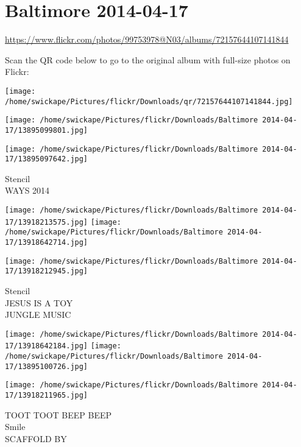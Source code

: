 \documentclass[10pt,letterpaper]{article}
\title{}
\author{}
\date{}
\begin{document}
\section*{Baltimore 2014-04-17}

\url{https://www.flickr.com/photos/99753978@N03/albums/72157644107141844}

Scan the QR code below to go to the original album with full-size photos on Flickr:

\texttt{[image: /home/swickape/Pictures/flickr/Downloads/qr/72157644107141844.jpg]}
\pagebreak

\texttt{[image: /home/swickape/Pictures/flickr/Downloads/Baltimore 2014-04-17/13895099801.jpg]}

\vspace{0.25in}
\texttt{[image: /home/swickape/Pictures/flickr/Downloads/Baltimore 2014-04-17/13895097642.jpg]}

Stencil\\
WAYS 2014
\pagebreak

\texttt{[image: /home/swickape/Pictures/flickr/Downloads/Baltimore 2014-04-17/13918213575.jpg]}
\texttt{[image: /home/swickape/Pictures/flickr/Downloads/Baltimore 2014-04-17/13918642714.jpg]}

\vspace{0.25in}
\texttt{[image: /home/swickape/Pictures/flickr/Downloads/Baltimore 2014-04-17/13918212945.jpg]}

Stencil\\
JESUS IS A TOY\\
JUNGLE MUSIC
\pagebreak

\texttt{[image: /home/swickape/Pictures/flickr/Downloads/Baltimore 2014-04-17/13918642184.jpg]}
\texttt{[image: /home/swickape/Pictures/flickr/Downloads/Baltimore 2014-04-17/13895100726.jpg]}

\texttt{[image: /home/swickape/Pictures/flickr/Downloads/Baltimore 2014-04-17/13918211965.jpg]}

TOOT TOOT BEEP BEEP\\
Smile\\
SCAFFOLD BY
\pagebreak
\end{document}
